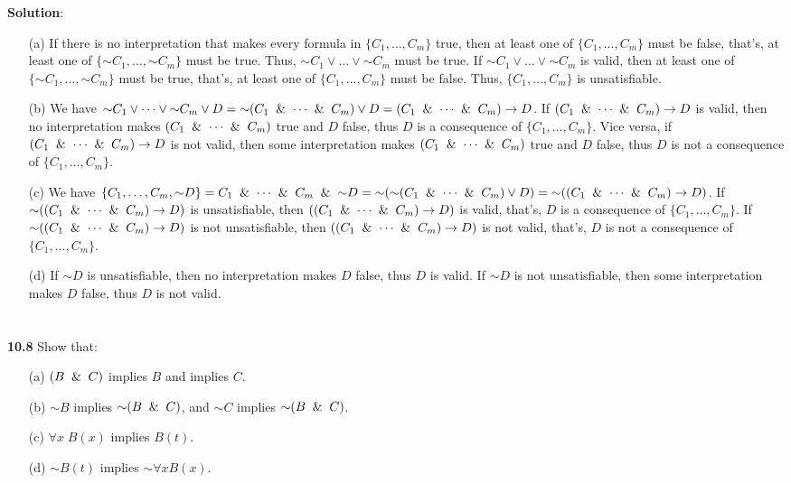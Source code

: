 \documentclass{ctexart}
\newcommand{\unsim}{\mathord{\sim}}
\begin{document}
\textbf{Solution}:

\begin{itemize}

\item[(a)] If there is no interpretation that makes every formula in $\{C_1 , \dots , C_m \}$ true, then at least one
of $\{C_1 , \dots , C_m \}$ must be false, that's, at least one of $\{ \unsim C_1, \dots, \unsim C_m \}$ must
be true. Thus, $\unsim C_1 \lor \dots \lor \unsim C_m$ must be true.
If $\unsim C_1 \lor \dots \lor \unsim C_m$ is valid, then at least one of $\{ \unsim C_1, \dots, \unsim C_m \}$ must
be true, that's, at least one of $\{C_1 , \dots , C_m \}$ must be false. Thus, $\{C_1 , \dots , C_m \}$ is unsatisfiable.

\item[(b)]
We have $\unsim C_1 \lor \dots \lor \unsim C_m \lor D = \unsim (C_1 \And \dots \And C_m) \lor D
= (C_1 \And \dots \And C_m) \to D$.
If $(C_1 \And \dots \And C_m) \to D$ is valid, then no interpretation makes $(C_1 \And \dots \And C_m)$ true
and $D$ false, thus $D$ is a consequence of $\{C_1 , \dots , C_m \}$. Vice versa, if
$(C_1 \And \dots \And C_m) \to D$ is not valid, then some interpretation makes $(C_1 \And \dots \And C_m)$ true
and $D$ false, thus $D$ is not a consequence of $\{C_1 , \dots , C_m \}$.

\item[(c)] We have $\{C_1 , \dots , C_m, \unsim D\} = C_1 \And \dots \And C_m \And \unsim D
= \unsim (\unsim (C_1 \And \dots \And C_m) \lor D)
= \unsim ((C_1 \And \dots \And C_m) \to D)
$. If $\unsim ((C_1 \And \dots \And C_m) \to D)$ is unsatisfiable, then $((C_1 \And \dots \And C_m) \to D)$
is valid, that's, $D$ is a consequence of $\{C_1 , \dots , C_m \}$.
If $\unsim ((C_1 \And \dots \And C_m) \to D)$ is not unsatisfiable, then $((C_1 \And \dots \And C_m) \to D)$
is not valid, that's, $D$ is not a consequence of $\{C_1 , \dots , C_m \}$.

\item[(d)] If $\unsim D$ is unsatisfiable, then no interpretation makes $D$ false, thus $D$ is valid.
If $\unsim D$ is not unsatisfiable, then some interpretation makes $D$ false, thus $D$ is not valid.

\end{itemize}

\section*{}
\textbf{10.8}
Show that:
\begin{itemize}
\item[(a)] $(B \And C)$ implies $B$ and implies $C$.
\item[ (b)] $\unsim B$ implies $\unsim(B \And C)$, and $\unsim C$ implies $\unsim (B \And C)$.
\item [(c)] $\forall x\; B(x)$ implies $B(t)$.
\item [(d)] $\unsim B(t)$ implies $\unsim \forall x B(x)$.
\end{itemize}
\end{document}
